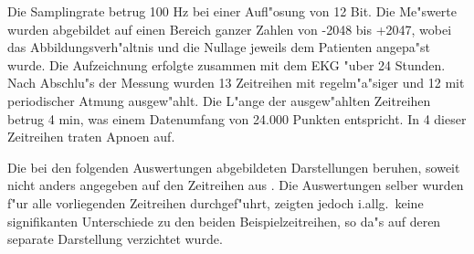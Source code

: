 Die Samplingrate betrug 100 Hz bei einer Aufl"osung von 12 Bit. Die Me"swerte wurden
abgebildet auf einen Bereich ganzer Zahlen von -2048 bis +2047, wobei das
Abbildungsverh"altnis und die Nullage jeweils dem Patienten angepa"st wurde. Die
Aufzeichnung erfolgte zusammen mit dem EKG "uber 24 Stunden. Nach Abschlu"s der Messung
wurden 13 Zeitreihen mit regelm"a"siger und 12 mit periodischer Atmung ausgew"ahlt. Die
L"ange der ausgew"ahlten Zeitreihen betrug 4 min, was einem Datenumfang von 24.000 Punkten
entspricht.  In 4 dieser Zeitreihen traten Apnoen auf.

Die bei den folgenden Auswertungen abgebildeten Darstellungen beruhen, soweit nicht anders 
angegeben auf den Zeitreihen aus . Die Auswertungen selber wurden f"ur
alle vorliegenden Zeitreihen durchgef"uhrt, zeigten jedoch i.allg.\  keine signifikanten
Unterschiede zu den beiden Beispielzeitreihen, so da"s auf deren separate Darstellung
verzichtet wurde.

